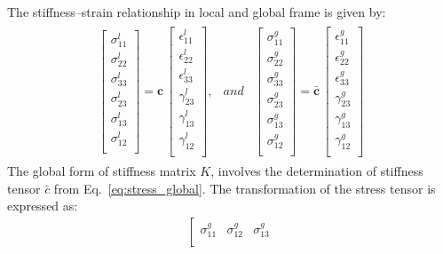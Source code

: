 \documentclass[materials,article,submit,moreauthors,pdftex]{Definitions/mdpi}
\begin{document}
{The stiffness--strain relationship in local and global frame is given by:
\begin{eqnarray}
\begin{array}{ccc}
\left [
\begin{array}{c}
\sigma^l_{11}\\
\sigma^l_{22}\\ 
\sigma^l_{33}\\ 
\sigma^l_{23}\\
\sigma^l_{13}\\
\sigma^l_{12}\\
\end{array}
\right ]=
\textbf{c}\,\left [
\begin{array}{c}
\epsilon^l_{11}\\
\epsilon^l_{22}\\ 
\epsilon^l_{33}\\
\gamma^l_{23}\\
\gamma^l_{13}\\
\gamma^l_{12}\\
\end{array}
\right ], & and &
\left [
\begin{array}{c}
\sigma^g_{11}\\
\sigma^g_{22}\\ 
\sigma^g_{33}\\ 
\sigma^g_{23}\\
\sigma^g_{13}\\
\sigma^g_{12}\\
\end{array}
\right ]=
\bar{\textbf{c}}\,\left [
\begin{array}{c}
\epsilon^g_{11}\\
\epsilon^g_{22}\\ 
\epsilon^g_{33}\\
\gamma^g_{23}\\
\gamma^g_{13}\\
\gamma^g_{12}\\
\end{array}
\right ]
\end{array}
\label{eq:stress_global}
\end{eqnarray}
The global form of stiffness matrix \(K\), involves the determination of stiffness tensor \(\bar{c}\) from Eq.~\ref{eq:stress_global}.
The transformation of the stress tensor is expressed as:
\begin{eqnarray}
\left [ 
\begin{array}{ccc}
\sigma^g_{11} & \sigma^g_{12} & \sigma^g_{13}\\

\end{array}
\end{eqnarray}}
\end{document}

